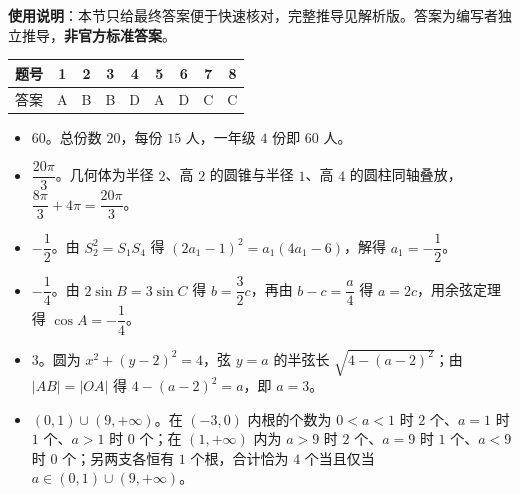 
\begin{gknotice}
\textbf{使用说明}：本节只给最终答案便于快速核对，完整推导见解析版。答案为编写者独立推导，\textbf{非官方标准答案}。
\end{gknotice}

\begin{center}\begin{tabular}{ccccccccc}
\toprule
题号 & 1 & 2 & 3 & 4 & 5 & 6 & 7 & 8 \\
\midrule
答案 & A & B & B & D & A & D & C & C \\
\bottomrule
\end{tabular}\end{center}

\begin{itemize}[leftmargin=2.6em]
  \item[\textbf{9.}] $60$。总份数 $20$，每份 $15$ 人，一年级 $4$ 份即 $60$ 人。
  \item[\textbf{10.}] $\dfrac{20\pi}{3}$。几何体为半径 $2$、高 $2$ 的圆锥与半径 $1$、高 $4$ 的圆柱同轴叠放，$\dfrac{8\pi}{3}+4\pi=\dfrac{20\pi}{3}$。
  \item[\textbf{11.}] $-\dfrac12$。由 $S_2^2=S_1S_4$ 得 $(2a_1-1)^2=a_1(4a_1-6)$，解得 $a_1=-\dfrac12$。
  \item[\textbf{12.}] $-\dfrac14$。由 $2\sin B=3\sin C$ 得 $b=\dfrac32c$，再由 $b-c=\dfrac a4$ 得 $a=2c$，用余弦定理得 $\cos A=-\dfrac14$。
  \item[\textbf{13.}] $3$。圆为 $x^2+(y-2)^2=4$，弦 $y=a$ 的半弦长 $\sqrt{4-(a-2)^2}$；由 $|AB|=|OA|$ 得 $4-(a-2)^2=a$，即 $a=3$。
  \item[\textbf{14.}] $(0,1)\cup(9,+\infty)$。在 $(-3,0)$ 内根的个数为 $0<a<1$ 时 $2$ 个、$a=1$ 时 $1$ 个、$a>1$ 时 $0$ 个；在 $(1,+\infty)$ 内为 $a>9$ 时 $2$ 个、$a=9$ 时 $1$ 个、$a<9$ 时 $0$ 个；另两支各恒有 $1$ 个根，合计恰为 $4$ 个当且仅当 $a\in(0,1)\cup(9,+\infty)$。
\end{itemize}


